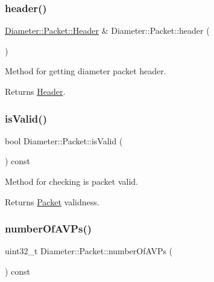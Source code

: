 \subsubsection{\texorpdfstring{header()}{header()}\hspace{0.1cm}{\footnotesize\ttfamily [2/2]}}
{\footnotesize\ttfamily \hyperlink{classDiameter_1_1Packet_1_1Header}{Diameter\+::\+Packet\+::\+Header} \& Diameter\+::\+Packet\+::header (\begin{DoxyParamCaption}{ }\end{DoxyParamCaption})}



Method for getting diameter packet header. 

\begin{DoxyReturn}{Returns}
\hyperlink{classDiameter_1_1Packet_1_1Header}{Header}. 
\end{DoxyReturn}
\mbox{\label{classDiameter_1_1Packet_ab6077555d623ff342c4821c0a0e29285}} 
\subsubsection{\texorpdfstring{is\+Valid()}{isValid()}}
{\footnotesize\ttfamily bool Diameter\+::\+Packet\+::is\+Valid (\begin{DoxyParamCaption}{ }\end{DoxyParamCaption}) const}



Method for checking is packet valid. 

\begin{DoxyReturn}{Returns}
\hyperlink{classDiameter_1_1Packet}{Packet} validness. 
\end{DoxyReturn}
\mbox{\label{classDiameter_1_1Packet_a9b11aa0f60e2a9cec525d98f6b1d8808}} 
\subsubsection{\texorpdfstring{number\+Of\+A\+V\+Ps()}{numberOfAVPs()}}
{\footnotesize\ttfamily uint32\+\_\+t Diameter\+::\+Packet\+::number\+Of\+A\+V\+Ps (\begin{DoxyParamCaption}{ }\end{DoxyParamCaption}) const}



